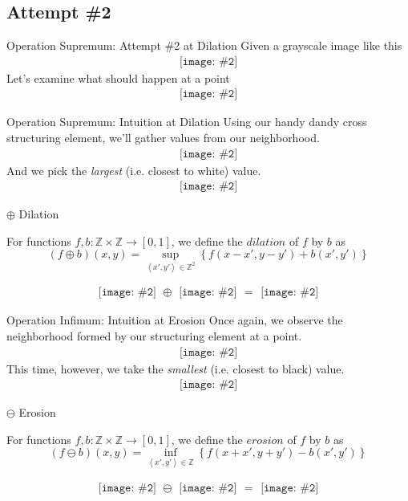 \documentclass{beamer}
\newcommand{\pic}[2]{
     \begin{array}{l}
      \texttt{[image: \#2]}
      \end{array}
}
\newcommand{\set}[1]{\left\lbrace #1 \right\rbrace}
\newcommand{\tuple}[1]{\left\langle #1 \right\rangle}
\newcommand{\integers}{\mathbb{Z}}
\newcommand{\dilate}{\oplus}
\newcommand{\erode}{\ominus}
\begin{document}
\subsection{Attempt \#2}

\begin{frame}{Operation Supremum: Attempt \#2 at Dilation}
  Given a grayscale image like this
  $$\pic{width=50pt}{images/grayscale_tiles.png}$$  
  Let's examine what should happen at a point
  $$\pic{width=50pt}{images/grayscale_tiles_point.png}$$
\end{frame}

\begin{frame}{Operation Supremum: Intuition at Dilation}
  Using our handy dandy cross structuring element, we'll gather values from
  our neighborhood.
  $$\pic{width=50pt}{images/grayscale_tiles_neighborhood.png}$$  
  And we pick the \emph{largest} (i.e. closest to white) value.
  $$\pic{width=50pt}{images/grayscale_tiles_point_replacement.png}$$
\end{frame}

\begin{frame}{$\dilate$ Dilation}
\begin{definition}
  For functions $f,b: \mathbb{Z}\times\mathbb{Z}\rightarrow [0,1]$,
  we define the $dilation$ of $f$ by $b$ as
  $$(f \dilate b)(x,y) = \displaystyle\sup_{\tuple{x',y'} \in \integers^2}
                                      \set{f(x-x',y-y') + b(x',y')}$$
\end{definition}
  $$\pic{width=50pt}{images/grayscale_tiles.png}
    \dilate \pic{width=50pt}{images/cross_inverted.png}
     = \pic{width=50pt}{images/grayscale_tiles_dilated.png}$$
\end{frame}

\begin{frame}{Operation Infimum: Intuition at Erosion}
  Once again, we observe the neighborhood formed by our structuring element
  at a point.
  $$\pic{width=50pt}{images/grayscale_tiles_neighborhood2.png}$$
  This time, however, we take the \emph{smallest} (i.e. closest to black)
  value.
  $$\pic{width=50pt}{images/grayscale_tiles_point_replacement2.png}$$
\end{frame}

\begin{frame}{$\erode$ Erosion}
\begin{definition}
  For functions $f,b: \mathbb{Z}\times\mathbb{Z}\rightarrow [0,1]$,
  we define the $erosion$ of $f$ by $b$ as
  $$(f \erode b)(x,y) = \displaystyle\inf_{\tuple{x',y'} \in \mathbb{Z}}
                                      \set{f(x+x',y+y') - b(x',y')}$$
\end{definition}
$$\pic{width=50pt}{images/grayscale_tiles.png}
  \erode \pic{width=50pt}{images/cross_inverted.png}
  = \pic{width=50pt}{images/grayscale_tiles_eroded.png}$$
\end{frame}
\end{document}
